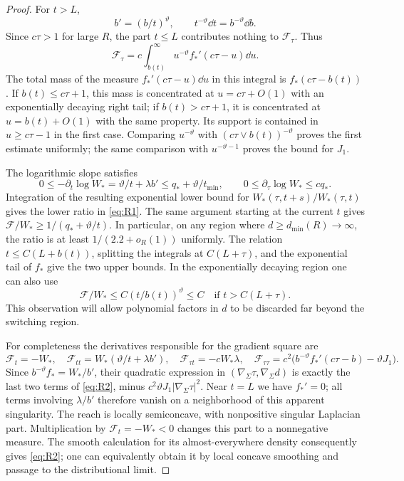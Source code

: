 \begin{proof}
For $t>L$,
\[
 b'=(b/t)^\vartheta,\qquad t^{-\vartheta}\dd t=b^{-\vartheta}\dd b.
\]
Since $c\tau>1$ for large $R$, the part $t\le L$ contributes nothing to
$\mathcal F_\tau$. Thus
\[
 \mathcal F_\tau
 =c\int_{b(t)}^\infty u^{-\vartheta}f_*'(c\tau-u)\dd u.
\]
The total mass of the measure $f_*'(c\tau-u)\dd u$ in this integral is
$f_*(c\tau-b(t))$. If $b(t)\le c\tau+1$, this mass is concentrated
at $u=c\tau+O(1)$ with an exponentially decaying right tail; if
$b(t)>c\tau+1$, it is concentrated at $u=b(t)+O(1)$ with the same
property. Its support is contained in $u\ge c\tau-1$ in the first case.
Comparing $u^{-\vartheta}$ with
$(c\tau\vee b(t))^{-\vartheta}$ proves the first estimate uniformly;
the same comparison with $u^{-\vartheta-1}$ proves the bound for $J_1$.

The logarithmic slope satisfies
\begin{equation}\label{eq:radial-weight-slopes}
 0\le-\partial_t\log W_*=\vartheta/t+\lambda b'\le
 q_*+\vartheta/t_{\min},\qquad 0\le\partial_\tau\log W_*\le cq_*.
\end{equation}
Integration of the resulting exponential lower bound for
$W_*(\tau,t+s)/W_*(\tau,t)$ gives the lower ratio in \eqref{eq:R1}.
The same argument starting at the current $t$ gives
$\mathcal F/W_*\ge1/(q_*+\vartheta/t)$. In particular, on any region
where $d\ge d_{\min}(R)\to\infty$, the ratio is at least
$1/(2.2+o_R(1))$ uniformly.
The relation $t\le C(L+b(t))$, splitting the integrals at $C(L+\tau)$,
and the exponential tail of $f_*$ give the two upper bounds.
In the exponentially decaying region one can also use
\[
 \mathcal F/W_*\le C(t/b(t))^\vartheta\le C
 \quad\text{if }t>C(L+\tau).
\]
This observation will allow polynomial factors in $d$ to be discarded
far beyond the switching region.

For completeness the derivatives responsible for the gradient square are
\[
 \mathcal F_t=-W_*,\quad
 \mathcal F_{tt}=W_*(\vartheta/t+\lambda b'),\quad
 \mathcal F_{\tau t}=-cW_*\lambda,\quad
 \mathcal F_{\tau\tau}
 =c^2\bigl(b^{-\vartheta}f_*'(c\tau-b)-\vartheta J_1\bigr).
\]
Since $b^{-\vartheta}f_*=W_*/b'$, their quadratic expression in
$(\nabla_\Sigma\tau,\nabla_\Sigma d)$ is exactly the last two terms
of \eqref{eq:R2}, minus $c^2\vartheta J_1|\nabla_\Sigma\tau|^2$.
Near $t=L$ we have $f_*'=0$; all terms involving $\lambda/b'$ therefore
vanish on a neighborhood of this apparent singularity.
The reach is locally semiconcave, with nonpositive singular Laplacian
part. Multiplication by $\mathcal F_t=-W_*<0$ changes this part to a
nonnegative measure. The smooth calculation for its almost-everywhere
density consequently gives \eqref{eq:R2}; one can equivalently obtain it
by local concave smoothing and passage to the distributional limit.
\end{proof}

